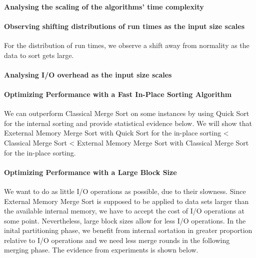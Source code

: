 \documentclass[twocolumn]{article}
\begin{document}
\paragraph*{Analysing the scaling of the algorithms' time complexity}

\paragraph*{Observing shifting distributions of run times as the input size scales}
For the distribution of run times, we observe a shift away from normality as the data to sort gets large.

\paragraph*{Analysing I/O overhead as the input size scales}

\paragraph*{Optimizing Performance with a Fast In-Place Sorting Algorithm}
We can outperform Classical Merge Sort on some instances by using Quick Sort for the internal sorting and provide statistical evidence below.
We will show that Exeternal Memory Merge Sort with Quick Sort for the in-place sorting < Classical Merge Sort < External Memory Merge Sort with Classical Merge Sort for the in-place sorting.

\paragraph*{Optimizing Performance with a Large Block Size}
We want to do as little I/O operations as possible, due to their slowness. Since External Memory Merge Sort is supposed to be applied to data sets larger than the available internal memory,
we have to accept the cost of I/O operations at some point. Nevertheless, large block sizes allow for less I/O operations. In the inital partitioning phase, we benefit from internal sortation
in greater proportion relative to I/O operations and we need less merge rounds in the following merging phase.
The evidence from experiments is shown below.
\end{document}
